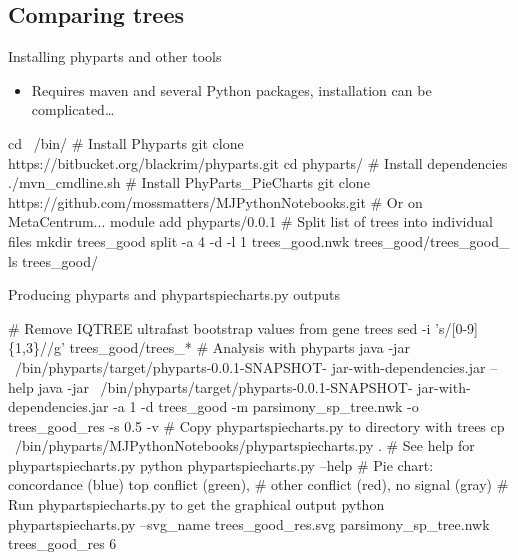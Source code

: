 \documentclass[compress, ucs, xelatex, 11pt, xcolor=x11names, aspectratio=169,
	hyperref={
		bookmarks=true,
		unicode=true,
		colorlinks=true,
		pdftitle={HybSeq course},
		plainpages=false,
		pdfauthor={Vojtech Zeisek},
		pdfsubject={Practical processing of HybSeq target enrichment sequencing data on computing grids like MetaCentrum},
		pdfcreator={XeLaTeX},
		pdfkeywords={BASH, command line, GNU, HybSeq, Linux, MetaCentrum, sequencing shell, target enrichment},
		linkcolor=Turquoise4, %
		anchorcolor=DodgerBlue4, %
		citecolor=DodgerBlue4, %
		filecolor=DodgerBlue4, %
		menucolor=Tan4, %
		urlcolor=DarkOliveGreen4, %
		pdftex},
	url={hyphens, lowtilde} %
	]{beamer}
\renewcommand{\texttt}[1]{\colorbox{Cornsilk2}{{\ttfamily #1}}}
\begin{document}
\subsection{Comparing trees}

\begin{frame}[fragile]{Installing phyparts and other tools}
	\begin{itemize}
		\item Requires \texttt{maven} and several Python packages, installation can be complicated\ldots
	\end{itemize}
	\begin{bashcode}
    cd ~/bin/
    # Install Phyparts
    git clone https://bitbucket.org/blackrim/phyparts.git
    cd phyparts/
    # Install dependencies
    ./mvn_cmdline.sh
    # Install PhyParts_PieCharts
    git clone https://github.com/mossmatters/MJPythonNotebooks.git
    # Or on MetaCentrum...
    module add phyparts/0.0.1
    # Split list of trees into individual files
    mkdir trees_good
    split -a 4 -d -l 1 trees_good.nwk trees_good/trees_good_
    ls trees_good/
	\end{bashcode}
\end{frame}

\begin{frame}[fragile]{Producing phyparts and phypartspiecharts.py outputs}
	\begin{bashcode}
    # Remove IQTREE ultrafast bootstrap values from gene trees
    sed -i 's/\/[0-9]\{1,3\}//g' trees_good/trees_*
    # Analysis with phyparts
    java -jar ~/bin/phyparts/target/phyparts-0.0.1-SNAPSHOT-
      jar-with-dependencies.jar --help
    java -jar ~/bin/phyparts/target/phyparts-0.0.1-SNAPSHOT-
      jar-with-dependencies.jar -a 1 -d trees_good -m
      parsimony_sp_tree.nwk -o trees_good_res -s 0.5 -v
    # Copy phypartspiecharts.py to directory with trees
    cp ~/bin/phyparts/MJPythonNotebooks/phypartspiecharts.py .
    # See help for phypartspiecharts.py
    python phypartspiecharts.py --help
    # Pie chart: concordance (blue) top conflict (green),
    # other conflict (red), no signal (gray)
    # Run phypartspiecharts.py to get the graphical output
    python phypartspiecharts.py --svg_name trees_good_res.svg
      parsimony_sp_tree.nwk trees_good_res 6
	\end{bashcode}
\end{frame}
\end{document}
